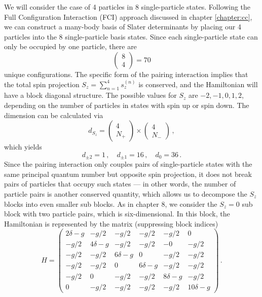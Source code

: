 We will consider the case of 4 particles in 8 single-particle states. Following
the Full Configuration Interaction (FCI) approach discussed in chapter \ref{chapter:cc},
we can construct a many-body basis of Slater determinants by placing
our 4 particles into the 8 single-particle basis states. Since each
single-particle state can only be occupied by one particle, there are
\begin{equation}
  \begin{pmatrix} 8 \\ 4\end{pmatrix} = 70
\end{equation}
unique configurations. The specific form of the pairing interaction
implies that the total spin projection $S_z = \sum_{n=1}^4 s_z^{(n)}$ 
is conserved, and the Hamiltonian will have a block diagonal structure.
The possible values for $S_z$ are $-2,-1,0,1,2$, depending on the number
of particles in states with spin up or spin down. The dimension can be
calculated via
\begin{equation}
 d_{S_z} = \begin{pmatrix} 4 \\ N_{+}\end{pmatrix} \times 
           \begin{pmatrix} 4 \\ N_{-}\end{pmatrix}\,,
\end{equation}
which yields 
\begin{equation}
 d_{\pm 2} = 1\,, \quad d_{\pm 1} = 16\,, \quad d_{0} = 36\,.
\end{equation}
Since the pairing interaction only couples pairs of single-particle 
states with the same principal quantum number but opposite spin
projection, it does not break pairs of particles that occupy such 
states --- in other words, the number of particle pairs is another
conserved quantity, which allows us to decompose the $S_z$ blocks
into even smaller sub blocks. As in chapter 8, we consider the $S_z=0$
sub block with two particle pairs, which is six-dimensional. In this
block, the Hamiltonian is represented by the matrix (suppressing
block indices)
\begin{equation}\label{eq:def_h_matrix}
  H = \begin{pmatrix}
  2\delta -g  &      -g/2  &       -g/2 &      -g/2 &      -g/2 &        0 \\ 
         -g/2 & 4\delta -g &       -g/2 &      -g/2 &        -0 &     -g/2 \\ 
         -g/2 &       -g/2 & 6\delta -g &         0 &      -g/2 &     -g/2 \\ 
         -g/2 &       -g/2 &          0 & 6\delta-g &      -g/2 &     -g/2 \\ 
         -g/2 &          0 &       -g/2 &      -g/2 & 8\delta-g &     -g/2 \\ 
            0 &       -g/2 &       -g/2 &      -g/2 &      -g/2 & 10\delta -g
  \end{pmatrix}\,.
\end{equation}

